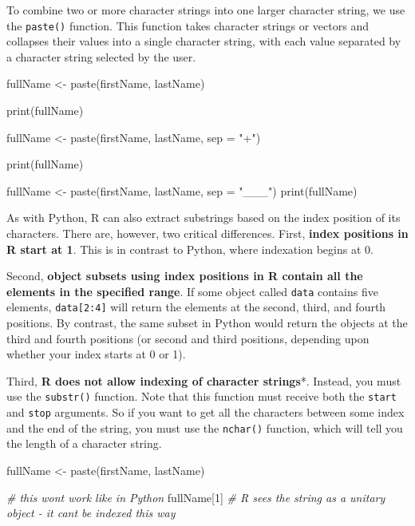 \documentclass[
]{book}
\newenvironment{Shaded}{\begin{snugshade}}{\end{snugshade}}
\newcommand{\AttributeTok}[1]{\textcolor[rgb]{0.77,0.63,0.00}{#1}}
\newcommand{\CommentTok}[1]{\textcolor[rgb]{0.56,0.35,0.01}{\textit{#1}}}
\newcommand{\DecValTok}[1]{\textcolor[rgb]{0.00,0.00,0.81}{#1}}
\newcommand{\FunctionTok}[1]{\textcolor[rgb]{0.00,0.00,0.00}{#1}}
\newcommand{\NormalTok}[1]{#1}
\newcommand{\OtherTok}[1]{\textcolor[rgb]{0.56,0.35,0.01}{#1}}
\newcommand{\StringTok}[1]{\textcolor[rgb]{0.31,0.60,0.02}{#1}}
\begin{document}
To combine two or more character strings into one larger character string, we use the \texttt{paste()} function. This function takes character strings or vectors and collapses their values into a single character string, with each value separated by a character string selected by the user.

\begin{Shaded}
\begin{Highlighting}[]
\NormalTok{fullName }\OtherTok{\textless{}{-}} \FunctionTok{paste}\NormalTok{(firstName, lastName)}

\FunctionTok{print}\NormalTok{(fullName)}

\NormalTok{fullName }\OtherTok{\textless{}{-}} \FunctionTok{paste}\NormalTok{(firstName, lastName, }\AttributeTok{sep =} \StringTok{"+"}\NormalTok{)}

\FunctionTok{print}\NormalTok{(fullName)}

\NormalTok{fullName }\OtherTok{\textless{}{-}} \FunctionTok{paste}\NormalTok{(firstName, lastName, }\AttributeTok{sep =} \StringTok{"\_\_\_"}\NormalTok{)}
\FunctionTok{print}\NormalTok{(fullName)}
\end{Highlighting}
\end{Shaded}

As with Python, R can also extract substrings based on the index position of its characters. There are, however, two critical differences. First, \textbf{index positions in R start at 1}. This is in contrast to Python, where indexation begins at 0.

Second, \textbf{object subsets using index positions in R contain all the elements in the specified range}. If some object called \texttt{data} contains five elements, \texttt{data{[}2:4{]}} will return the elements at the second, third, and fourth positions. By contrast, the same subset in Python would return the objects at the third and fourth positions (or second and third positions, depending upon whether your index starts at 0 or 1).

Third, \textbf{R does not allow indexing of character strings}*. Instead, you must use the \texttt{substr()} function. Note that this function must receive both the \texttt{start} and \texttt{stop} arguments. So if you want to get all the characters between some index and the end of the string, you must use the \texttt{nchar()} function, which will tell you the length of a character string.

\begin{Shaded}
\begin{Highlighting}[]
\NormalTok{fullName }\OtherTok{\textless{}{-}} \FunctionTok{paste}\NormalTok{(firstName, lastName)}

\CommentTok{\# this won\textquotesingle{}t work like in Python}
\NormalTok{fullName[}\DecValTok{1}\NormalTok{] }\CommentTok{\# R sees the string as a unitary object {-} it can\textquotesingle{}t be indexed this way}
\end{Highlighting}
\end{Shaded}
\end{document}
